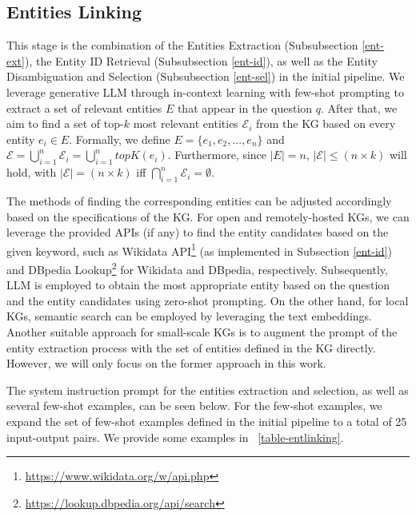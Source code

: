 \subsection{Entities Linking} \label{entities-linking}
This stage is the combination of the Entities Extraction (Subsubsection \ref{ent-ext}), the Entity ID Retrieval (Subsubsection \ref{ent-id}), as well as the Entity Disambiguation and Selection (Subsubsection \ref{ent-sel}) in the initial pipeline. We leverage generative LLM through in-context learning with few-shot prompting to extract a set of relevant entities $E$ that appear in the question $q$. After that, we aim to find a set of top-$k$ most relevant entities $\mathcal{E}_i$ from the KG based on every entity $e_i \in E$. Formally, we define $E = \{e_1, e_2, ..., e_n\}$ and $\mathcal{E}=\bigcup_{i=1}^{n} \mathcal{E}_i=\bigcup_{i=1}^{n} topK(e_i)$. Furthermore, since $|E|=n$, $|\mathcal{E}| \leq (n \times k)$ will hold, with $|\mathcal{E}| = (n \times k)$ iff $\bigcap_{i=1}^{n} \mathcal{E}_i=\emptyset$.

The methods of finding the corresponding entities can be adjusted accordingly based on the specifications of the KG. For open and remotely-hosted KGs, we can leverage the provided APIs (if any) to find the entity candidates based on the given keyword, such as Wikidata API\footnote{\url{https://www.wikidata.org/w/api.php}} (as implemented in Subsection \ref{ent-id}) and DBpedia Lookup\footnote{\url{https://lookup.dbpedia.org/api/search}} for Wikidata and DBpedia, respectively. Subsequently, LLM is employed to obtain the most appropriate entity based on the question and the entity candidates using zero-shot prompting. On the other hand, for local KGs, semantic search can be employed by leveraging the text embeddings. Another suitable approach for small-scale KGs is to augment the prompt of the entity extraction process with the set of entities defined in the KG directly. However, we will only focus on the former approach in this work.

The system instruction prompt for the entities extraction and selection, as well as several few-shot examples, can be seen below. For the few-shot examples, we expand the set of few-shot examples defined in the initial pipeline to a total of 25 input-output pairs. We provide some examples in \tab~\ref{table-entlinking}.\\
\promptFivePartOne

\vspace{1em}

